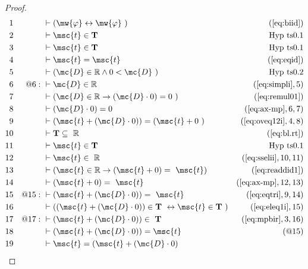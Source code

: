 \begin{proof}
\begin{align}
  1 &&  & \vdash ( \mw{\varphi} \leftrightarrow \mw{\varphi}
     ~)&(\mbox{\ref{eq:biid}})\notag
  \\ 2 &&  & \vdash \msc{t} \in \mathbf{T}&\text{Hyp~ts0.1}\notag%
  \\ 3 &&  & \vdash \msc{t} \in \mathbf{T}&\text{Hyp~ts0.1}\notag%
  \\ 4 &&  & \vdash \msc{t} = \msc{t}&(\mbox{\ref{eq:eqid}})\notag
  \\ 5 &&  & \vdash ( \mc{D} \in \mathbb{R} \wedge 0 < \mc{D}
     ~)&\text{Hyp~ts0.2}\notag%
  \\ 6 && @6:\  & \vdash \mc{D} \in \mathbb{R}&(\mbox{\ref{eq:simpli}},5)\notag
  \\ 7 &&  & \vdash ( \mc{D} \in \mathbb{R} \rightarrow ( \mc{D} \cdot 0 ) = 0
     ~)&(\mbox{\ref{eq:remul01}})\notag
  \\ 8 &&  & \vdash ( \mc{D} \cdot 0 ) = 0&(\mbox{\ref{eq:ax-mp}},6,7)\notag
  \\ 9 &&  & \vdash ( \msc{t} + ( \mc{D} \cdot 0 ) ) = ( \msc{t} + 0
     ~)&(\mbox{\ref{eq:oveq12i}},4,8)\notag
  \\ 10 &&  & \vdash \mathbf{T} \subseteq
     ~\mathbb{R}&(\mbox{\ref{eq:bl.rt}})\notag
  \\ 11 &&  & \vdash \msc{t} \in \mathbf{T}&\text{Hyp~ts0.1}\notag%
  \\ 12 &&  & \vdash \msc{t} \in
     ~\mathbb{R}&(\mbox{\ref{eq:sselii}},10,11)\notag
  \\ 13 &&  & \vdash ( \msc{t} \in \mathbb{R} \rightarrow ( \msc{t} + 0 ) =
     ~\msc{t} )&(\mbox{\ref{eq:readdid1}})\notag
  \\ 14 &&  & \vdash ( \msc{t} + 0 ) =
     ~\msc{t}&(\mbox{\ref{eq:ax-mp}},12,13)\notag
  \\ 15 && @15:\  & \vdash ( \msc{t} + ( \mc{D} \cdot 0 ) ) =
     ~\msc{t}&(\mbox{\ref{eq:eqtri}},9,14)\notag
  \\ 16 &&  & \vdash ( ( \msc{t} + ( \mc{D} \cdot 0 ) ) \in \mathbf{T}
     ~\leftrightarrow \msc{t} \in \mathbf{T}
     ~)&(\mbox{\ref{eq:eleq1i}},15)\notag
  \\ 17 && @17:\  & \vdash ( \msc{t} + ( \mc{D} \cdot 0 ) ) \in
     ~\mathbf{T}&(\mbox{\ref{eq:mpbir}},3,16)\notag
  \\ 18 &&  & \vdash ( \msc{t} + ( \mc{D} \cdot 0 ) ) = \msc{t}&(@15)\notag
  \\ 19 &&  & \vdash \msc{t} = ( \msc{t} + ( \mc{D} \cdot 0 )

\end{align}
\end{proof}

